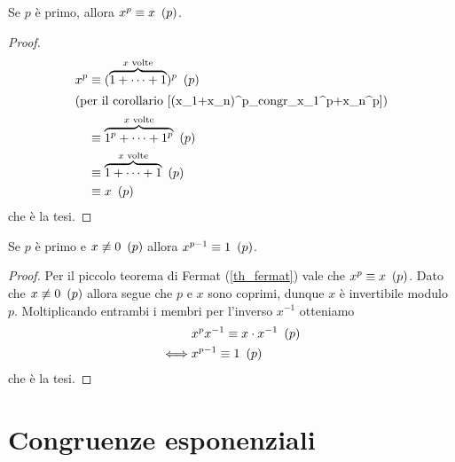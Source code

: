 \begin{theorem}
     \label{th_fermat}
    Se $p$ è primo, allora $x^p \equiv x \ \left(p\right)$.
\end{theorem}
\begin{proof}
    \begin{alignat*}{1}
        x^p &\equiv (\overbrace{1 +\dots+ 1}^{x \text{ volte}})^p \ \left(p\right)\\
        \intertext{(per il corollario \ref{(x_1+x_n)^p_congr_x_1^p+x_n^p})}
        &\equiv \overbrace{1^p +\dots+ 1^p}^{x \text{ volte}} \ \left(p\right)\\
        &\equiv \overbrace{1 +\dots+ 1}^{x \text{ volte}} \ \left(p\right)\\
        &\equiv x \ \left(p\right)
    \end{alignat*}
    che è la tesi.
\end{proof}

\begin{corollary} \label{corollario_fermat}
    Se $p$ è primo e $x \not\equiv 0 \ \left(p\right)$ allora $x^{p-1} \equiv 1 \ \left(p\right)$.
\end{corollary}
\begin{proof}
    Per il piccolo teorema di Fermat (\ref{th_fermat}) vale che $x^p \equiv x \ \left(p\right)$. Dato che $x \not\equiv 0 \ \left(p\right)$ allora segue che $p$ e $x$ sono coprimi, dunque $x$ è invertibile modulo $p$. Moltiplicando entrambi i membri per l'inverso $x^{-1}$ otteniamo \begin{alignat*}
        {1}
        &x^px^{-1} \equiv x\cdot x^{-1} \ \left(p\right)\\
        \iff &x^{p-1} \equiv 1 \ \left(p\right)
    \end{alignat*}
    che è la tesi.    
\end{proof}

\section{Congruenze esponenziali}

